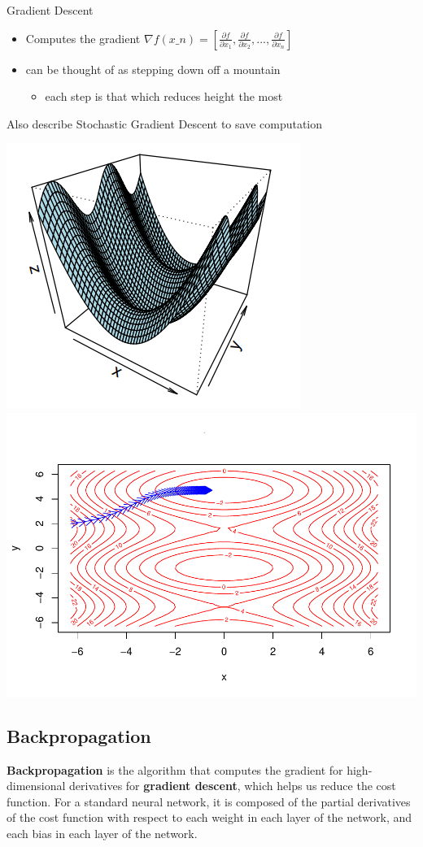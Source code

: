 Gradient Descent

\begin{itemize}
\tightlist
\item
  Computes the gradient 
$  
  \nabla f(x\_n) =
  \left[ \frac{\partial f}{\partial x_1} , \frac{\partial f}{\partial x_2} , ... , \frac{\partial f}{\partial x_n} \right]
$
  
\item
  can be thought of as stepping down off a mountain

  \begin{itemize}
  \tightlist
  \item
    each step is that which reduces height the most
  \end{itemize}
\end{itemize}

Also describe Stochastic Gradient Descent to save computation

    \includegraphics[width = .4\textwidth]{Figures/grad_desc-51.png}
    \includegraphics[width = .6\textwidth]{Figures/grad_desc-50.pdf}


\hypertarget{backpropagation}{%
\subsection{Backpropagation}\label{backpropagation}}

\textbf{Backpropagation} is the algorithm that computes the gradient for
high-dimensional derivatives for \textbf{gradient descent}, which helps
us reduce the cost function. For a standard neural network, it is
composed of the partial derivatives of the cost function with respect to
each weight in each layer of the network, and each bias in each layer of
the network.

